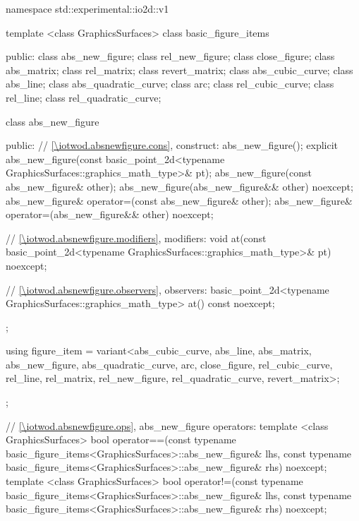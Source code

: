 \begin{codeblock}
namespace std::experimental::io2d::v1 {
  template <class GraphicsSurfaces>
  class basic_figure_items {
  public:
    class abs_new_figure;
    class rel_new_figure;
    class close_figure;
    class abs_matrix;
    class rel_matrix;
    class revert_matrix;
    class abs_cubic_curve;
    class abs_line;
    class abs_quadratic_curve;
    class arc;
    class rel_cubic_curve;
    class rel_line;
    class rel_quadratic_curve;

    class abs_new_figure {
    public:
      // \ref{\iotwod.absnewfigure.cons}, construct:
      abs_new_figure();
      explicit abs_new_figure(const basic_point_2d<typename
      GraphicsSurfaces::graphics_math_type>& pt);
      abs_new_figure(const abs_new_figure& other);
      abs_new_figure(abs_new_figure&& other) noexcept;
      abs_new_figure& operator=(const abs_new_figure& other);
      abs_new_figure& operator=(abs_new_figure&& other) noexcept;

      // \ref{\iotwod.absnewfigure.modifiers}, modifiers:
      void at(const basic_point_2d<typename GraphicsSurfaces::graphics_math_type>& pt) noexcept;

      // \ref{\iotwod.absnewfigure.observers}, observers:
      basic_point_2d<typename GraphicsSurfaces::graphics_math_type> at() const noexcept;
    };

    using figure_item = variant<abs_cubic_curve, abs_line, abs_matrix, abs_new_figure,
      abs_quadratic_curve, arc, close_figure, rel_cubic_curve, rel_line, rel_matrix,
      rel_new_figure, rel_quadratic_curve, revert_matrix>;
  };

  // \ref{\iotwod.absnewfigure.ops}, abs_new_figure operators:
  template <class GraphicsSurfaces>
  bool operator==(const typename basic_figure_items<GraphicsSurfaces>::abs_new_figure& lhs,
    const typename basic_figure_items<GraphicsSurfaces>::abs_new_figure& rhs) noexcept;
  template <class GraphicsSurfaces>
  bool operator!=(const typename basic_figure_items<GraphicsSurfaces>::abs_new_figure& lhs,
    const typename basic_figure_items<GraphicsSurfaces>::abs_new_figure& rhs) noexcept;
  
}
\end{codeblock}
